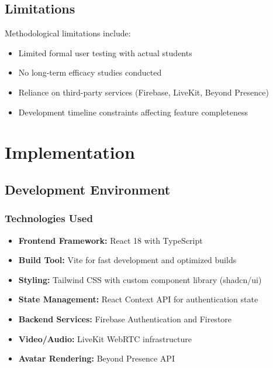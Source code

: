 \documentclass[11pt,a4paper]{article}
\begin{document}
\subsection{Limitations}
Methodological limitations include:

\begin{itemize}
    \item Limited formal user testing with actual students
    \item No long-term efficacy studies conducted
    \item Reliance on third-party services (Firebase, LiveKit, Beyond Presence)
    \item Development timeline constraints affecting feature completeness
\end{itemize}

\newpage

\section{Implementation}

\subsection{Development Environment}

\subsubsection{Technologies Used}
\begin{itemize}
    \item \textbf{Frontend Framework:} React 18 with TypeScript
    \item \textbf{Build Tool:} Vite for fast development and optimized builds
    \item \textbf{Styling:} Tailwind CSS with custom component library (shadcn/ui)
    \item \textbf{State Management:} React Context API for authentication state
    \item \textbf{Backend Services:} Firebase Authentication and Firestore
    \item \textbf{Video/Audio:} LiveKit WebRTC infrastructure
    \item \textbf{Avatar Rendering:} Beyond Presence API
\end{itemize}
\end{document}
